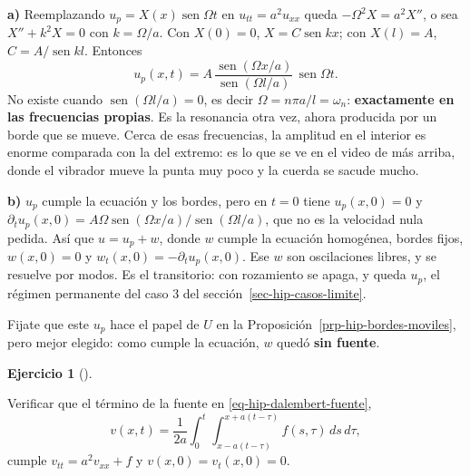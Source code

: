 \documentclass[
  spanish,
  a4paper,
]{scrbook}
\theoremstyle{definition}
\theoremstyle{plain}
\theoremstyle{definition}
\theoremstyle{plain}
\theoremstyle{definition}
\newtheorem{exercise}{Ejercicio}[chapter]
\theoremstyle{remark}
\begin{document}
\begin{tcolorbox}[enhanced jigsaw, arc=.35mm, bottomrule=.15mm, bottomtitle=1mm, breakable, colback=white, colbacktitle=quarto-callout-tip-color!10!white, colframe=quarto-callout-tip-color-frame, coltitle=black, left=2mm, leftrule=.75mm, opacityback=0, opacitybacktitle=0.6, rightrule=.15mm, title=\textcolor{quarto-callout-tip-color}{\faLightbulb}\hspace{0.5em}{Solución}, titlerule=0mm, toprule=.15mm, toptitle=1mm]

\textbf{a)} Reemplazando \(u_p = X(x)\operatorname{sen}\Omega t\) en
\(u_{tt} = a^2u_{xx}\) queda \(-\Omega^2X = a^2X''\), o sea
\(X'' + k^2X = 0\) con \(k = \Omega/a\). Con \(X(0) = 0\),
\(X = C\operatorname{sen}kx\); con \(X(l) = A\),
\(C = A/\operatorname{sen}kl\). Entonces \[
u_p(x,t) = A\,\frac{\operatorname{sen}(\Omega x/a)}{\operatorname{sen}(\Omega l/a)}\,\operatorname{sen}\Omega t .
\] No existe cuando \(\operatorname{sen}(\Omega l/a) = 0\), es decir
\(\Omega = n\pi a/l = \omega_n\): \textbf{exactamente en las frecuencias
propias}. Es la resonancia otra vez, ahora producida por un borde que se
mueve. Cerca de esas frecuencias, la amplitud en el interior es enorme
comparada con la del extremo: es lo que se ve en el video de más arriba,
donde el vibrador mueve la punta muy poco y la cuerda se sacude mucho.

\textbf{b)} \(u_p\) cumple la ecuación y los bordes, pero en \(t=0\)
tiene \(u_p(x,0) = 0\) y
\(\partial_tu_p(x,0) = A\Omega\operatorname{sen}(\Omega x/a)/\operatorname{sen}(\Omega l/a)\),
que no es la velocidad nula pedida. Así que \(u = u_p + w\), donde \(w\)
cumple la ecuación homogénea, bordes fijos, \(w(x,0) = 0\) y
\(w_t(x,0) = -\partial_tu_p(x,0)\). Ese \(w\) son oscilaciones libres, y
se resuelve por modos. Es el transitorio: con rozamiento se apaga, y
queda \(u_p\), el régimen permanente del caso 3 del
sección~\ref{sec-hip-casos-limite}.

Fijate que este \(u_p\) hace el papel de \(U\) en la
Proposición~\ref{prp-hip-bordes-moviles}, pero mejor elegido: como
cumple la ecuación, \(w\) quedó \textbf{sin fuente}.

\end{tcolorbox}

\begin{exercise}[]\protect\hypertarget{exr-hip-duhamel}{}\label{exr-hip-duhamel}

Verificar que el término de la fuente en \ref{eq-hip-dalembert-fuente},
\[v(x,t) = \frac{1}{2a}\int_0^t\int_{x-a(t-\tau)}^{x+a(t-\tau)} f(s,\tau)\,ds\,d\tau,\]
cumple \(v_{tt} = a^2v_{xx} + f\) y \(v(x,0) = v_t(x,0) = 0\).

\end{exercise}
\end{document}
